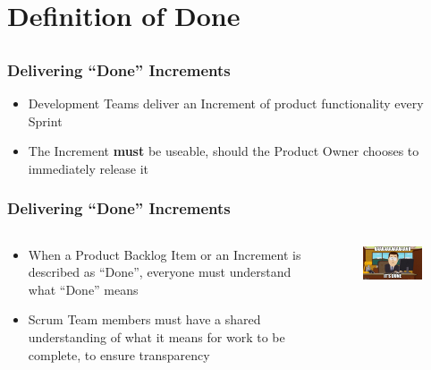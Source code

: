\section{Definition of Done}
\subsection{}

\begin{frame}
    \frametitle{Delivering ``Done'' Increments}
    \begin{itemize}
        \setlength\itemsep{0.7em}
        \item Development Teams deliver an Increment of product functionality every Sprint
        \item The Increment \textbf{must} be useable, should the Product Owner chooses to immediately release it
    \end{itemize}
\end{frame}

\begin{frame}
    \frametitle{Delivering ``Done'' Increments}
    \begin{columns}
        \begin{column}{0.5\textwidth}
            \begin{itemize}
                \setlength\itemsep{0.7em}
                \item When a Product Backlog Item or an Increment is described as ``Done'', everyone must understand what ``Done'' means
                \item Scrum Team members must have a shared understanding of what it means for work to be complete, to ensure transparency
            \end{itemize}
        \end{column}
        \begin{column}{0.5\textwidth}
            \vspace{-1em}
            \begin{figure}
                \includegraphics[width=2.7in]{images/itsdone.jpg}
            \end{figure}
        \end{column}
    \end{columns}
\end{frame}

